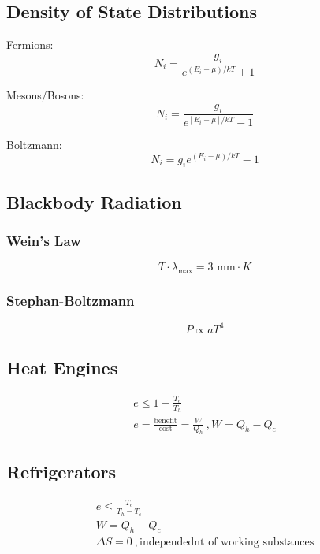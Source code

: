 \documentclass[10pt,letter]{article}
\begin{document}
\subsection{Density of State Distributions}
Fermions:
\begin{equation}
    N_i = \frac{g_i}{e^{(E_i - \mu)/kT}+1}
\end{equation}

Mesons/Bosons:
\begin{equation}
  N_i = \frac{g_i}{e^{[E_i - \mu]/kT} - 1}
\end{equation}

Boltzmann:
\begin{equation}
  N_i = {g_i}{e^{(E_i - \mu)/kT} - 1}
\end{equation}

\subsection{Blackbody Radiation}
\subsubsection{Wein's Law}
\begin{equation}
 T\cdot \lambda_{\textrm{max}} = 3\textrm{ mm}\cdot K
\end{equation}
\subsubsection{Stephan-Boltzmann}
\begin{equation}
 P \propto aT^4 
\end{equation}

\subsection{Heat Engines}
\begin{align}
 e \leq 1 - \frac{T_c}{T_h}\\
 e = \frac{\textrm{benefit}}{\textrm{cost}} = \frac{W}{Q_h}~,W = Q_h - Q_c
\end{align}

\subsection{Refrigerators}
\begin{align}
 e \leq \frac{T_c}{T_h - T_c}\\
 W = Q_h - Q_c\\
 \Delta S = 0~,\textrm{independednt of working substances}
\end{align}
\end{document}
